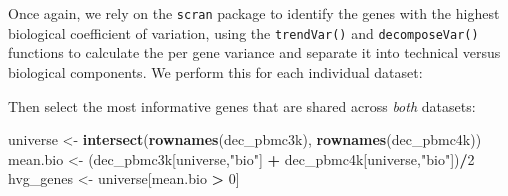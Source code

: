 \documentclass[]{book}
\newenvironment{Shaded}{\begin{snugshade}}{\end{snugshade}}
\newcommand{\DataTypeTok}[1]{\textcolor[rgb]{0.13,0.29,0.53}{#1}}
\newcommand{\DecValTok}[1]{\textcolor[rgb]{0.00,0.00,0.81}{#1}}
\newcommand{\KeywordTok}[1]{\textcolor[rgb]{0.13,0.29,0.53}{\textbf{#1}}}
\newcommand{\NormalTok}[1]{#1}
\newcommand{\OperatorTok}[1]{\textcolor[rgb]{0.81,0.36,0.00}{\textbf{#1}}}
\newcommand{\OtherTok}[1]{\textcolor[rgb]{0.56,0.35,0.01}{#1}}
\newcommand{\StringTok}[1]{\textcolor[rgb]{0.31,0.60,0.02}{#1}}
\begin{document}
Once again, we rely on the \texttt{scran} package to identify the genes with the highest biological coefficient of variation, using the \texttt{trendVar()} and \texttt{decomposeVar()} functions to calculate the per gene variance and separate it into technical versus biological components. We perform this for each individual dataset:

\begin{Shaded}
\end{Shaded}

Then select the most informative genes that are shared across \emph{both} datasets:

\begin{Shaded}
\begin{Highlighting}[]
\NormalTok{universe <-}\StringTok{ }\KeywordTok{intersect}\NormalTok{(}\KeywordTok{rownames}\NormalTok{(dec_pbmc3k), }\KeywordTok{rownames}\NormalTok{(dec_pbmc4k))}
\NormalTok{mean.bio <-}\StringTok{ }\NormalTok{(dec_pbmc3k[universe,}\StringTok{"bio"}\NormalTok{] }\OperatorTok{+}\StringTok{ }\NormalTok{dec_pbmc4k[universe,}\StringTok{"bio"}\NormalTok{])}\OperatorTok{/}\DecValTok{2}
\NormalTok{hvg_genes <-}\StringTok{ }\NormalTok{universe[mean.bio }\OperatorTok{>}\StringTok{ }\DecValTok{0}\NormalTok{]}
\end{Highlighting}
\end{Shaded}
\end{document}
